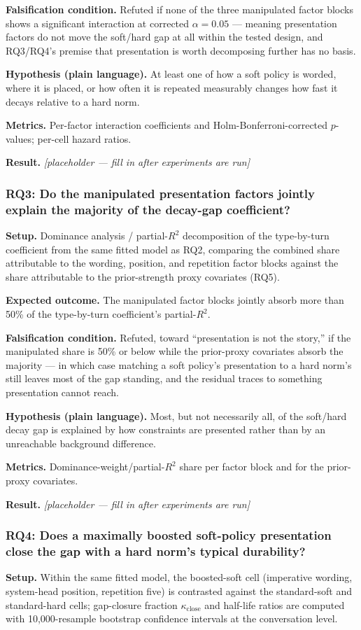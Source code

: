 \documentclass[11pt]{article}
\newcommand{\ph}{\textit{[placeholder --- fill in after experiments are run]}}
\begin{document}
\textbf{Falsification condition.} Refuted if none of the three manipulated factor blocks shows a significant interaction at corrected $\alpha = 0.05$ --- meaning presentation factors do not move the soft/hard gap at all within the tested design, and RQ3/RQ4's premise that presentation is worth decomposing further has no basis.

\textbf{Hypothesis (plain language).} At least one of how a soft policy is worded, where it is placed, or how often it is repeated measurably changes how fast it decays relative to a hard norm.

\textbf{Metrics.} Per-factor interaction coefficients and Holm-Bonferroni-corrected $p$-values; per-cell hazard ratios.

\textbf{Result.} \ph

\subsubsection{RQ3: Do the manipulated presentation factors jointly explain the majority of the decay-gap coefficient?}
\textbf{Setup.} Dominance analysis / partial-$R^2$ decomposition of the type-by-turn coefficient from the same fitted model as RQ2, comparing the combined share attributable to the wording, position, and repetition factor blocks against the share attributable to the prior-strength proxy covariates (RQ5).

\textbf{Expected outcome.} The manipulated factor blocks jointly absorb more than 50\% of the type-by-turn coefficient's partial-$R^2$.

\textbf{Falsification condition.} Refuted, toward ``presentation is not the story,'' if the manipulated share is 50\% or below while the prior-proxy covariates absorb the majority --- in which case matching a soft policy's presentation to a hard norm's still leaves most of the gap standing, and the residual traces to something presentation cannot reach.

\textbf{Hypothesis (plain language).} Most, but not necessarily all, of the soft/hard decay gap is explained by how constraints are presented rather than by an unreachable background difference.

\textbf{Metrics.} Dominance-weight/partial-$R^2$ share per factor block and for the prior-proxy covariates.

\textbf{Result.} \ph

\subsubsection{RQ4: Does a maximally boosted soft-policy presentation close the gap with a hard norm's typical durability?}
\textbf{Setup.} Within the same fitted model, the boosted-soft cell (imperative wording, system-head position, repetition five) is contrasted against the standard-soft and standard-hard cells; gap-closure fraction $\kappa_{\text{close}}$ and half-life ratios are computed with 10,000-resample bootstrap confidence intervals at the conversation level.
\end{document}
